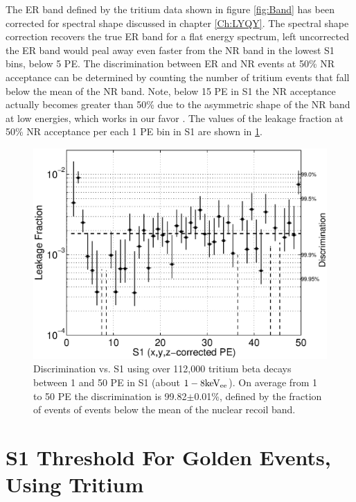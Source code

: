 The ER band defined by the tritium data shown in figure \ref{fig:Band} has been corrected for spectral shape discussed in chapter \ref{Ch:LYQY}. The spectral shape correction recovers the true ER band for a flat energy spectrum, left uncorrected the ER band would peal away even faster from the NR band in the lowest S1 bins, below 5 PE. The discrimination between ER and NR events at 50\% NR acceptance can be determined by counting the number of tritium events that fall below the mean of the NR band. Note, below 15 PE in S1 the NR acceptance actually becomes greater than 50\% due to the asymmetric shape of the NR band at low energies, which works in our favor \cite{NEST} \cite{NEST_2013}. The values of the leakage fraction at 50\% NR acceptance per each 1 PE bin in S1 are shown in \ref{fig:Leak}. 

\renewcommand{\baselinestretch}{1}
\small\normalsize
\begin{figure}[h!]\centering
\includegraphics[width=120mm]{Chapter_T/Figures/ER_Band/CH3T_Leakage_fid_50_.eps}
\caption{Discrimination vs. S1 using over 112,000 tritium beta decays between 1 and 50 PE in S1 (about $\rm1-8 keV_{ee}$). On average from 1 to 50 PE the discrimination is 99.82$\pm$0.01\%, defined by the fraction of events of events below the mean of the nuclear recoil band.}
\label{fig:Leak}
\end{figure}
\renewcommand{\baselinestretch}{2}
\small\normalsize





\section{S1 Threshold For Golden Events, Using Tritium}

